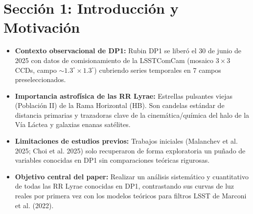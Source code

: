 \documentclass[11pt,a4paper]{article}
\begin{document}
\section{Sección 1: Introducción y Motivación}
\begin{itemize}
    \item \textbf{Contexto observacional de DP1:} Rubin DP1 se liberó el 30 de junio de 2025 con datos de comisionamiento de la LSSTComCam (mosaico $3\times3$ CCDs, campo $\sim1.3^\circ \times 1.3^\circ$) cubriendo series temporales en 7 campos preseleccionados.
    \item \textbf{Importancia astrofísica de las RR Lyrae:} Estrellas pulsantes viejas (Población II) de la Rama Horizontal (HB). Son candelas estándar de distancia primarias y trazadoras clave de la cinemática/química del halo de la Vía Láctea y galaxias enanas satélites.
    \item \textbf{Limitaciones de estudios previos:} Trabajos iniciales (Malanchev et al. 2025; Choi et al. 2025) solo recuperaron de forma exploratoria un puñado de variables conocidas en DP1 sin comparaciones teóricas rigurosas.
    \item \textbf{Objetivo central del paper:} Realizar un análisis sistemático y cuantitativo de todas las RR Lyrae conocidas en DP1, contrastando sus curvas de luz reales por primera vez con los modelos teóricos para filtros LSST de Marconi et al. (2022).
\end{itemize}
\end{document}
